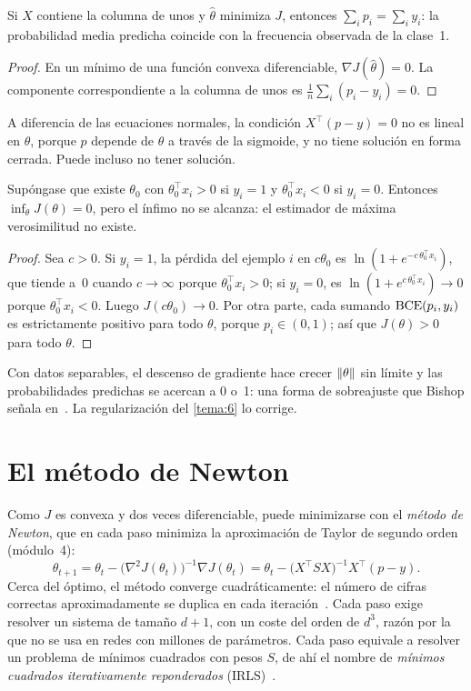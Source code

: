 \begin{corolario}\label{cor:calibracion}
Si $X$ contiene la columna de unos y $\hat\theta$ minimiza $J$, entonces $\sum_i p_i=\sum_i y_i$: la probabilidad media predicha coincide con la frecuencia observada de la clase~1.
\end{corolario}

\begin{proof}
En un mínimo de una función convexa diferenciable, $\nabla J(\hat\theta)=0$. La componente correspondiente a la columna de unos es $\frac1n\sum_i(p_i-y_i)=0$.
\end{proof}

A diferencia de las ecuaciones normales, la condición $X^{\top}(p-y)=0$ no es lineal en $\theta$, porque $p$ depende de $\theta$ a través de la sigmoide, y no tiene solución en forma cerrada. Puede incluso no tener solución.

\begin{proposicion}\label{prop:separable}
Supóngase que existe $\theta_0$ con $\theta_0^{\top}x_i>0$ si $y_i=1$ y $\theta_0^{\top}x_i<0$ si $y_i=0$. Entonces $\inf_\theta J(\theta)=0$, pero el ínfimo no se alcanza: el estimador de máxima verosimilitud no existe.
\end{proposicion}

\begin{proof}
Sea $c>0$. Si $y_i=1$, la pérdida del ejemplo $i$ en $c\theta_0$ es $\ln(1+e^{-c\,\theta_0^{\top}x_i})$, que tiende a~0 cuando $c\to\infty$ porque $\theta_0^{\top}x_i>0$; si $y_i=0$, es $\ln(1+e^{c\,\theta_0^{\top}x_i})\to 0$ porque $\theta_0^{\top}x_i<0$. Luego $J(c\theta_0)\to 0$. Por otra parte, cada sumando $\operatorname{BCE}(p_i,y_i)$ es estrictamente positivo para todo $\theta$, porque $p_i\in(0,1)$; así que $J(\theta)>0$ para todo $\theta$.
\end{proof}

Con datos separables, el descenso de gradiente hace crecer $\lVert\theta\rVert$ sin límite y las probabilidades predichas se acercan a 0 o~1: una forma de sobreajuste que Bishop señala en~\cite[§4.3.2]{bishop}. La regularización del \cref{tema:6} lo corrige.

\section{El método de Newton}

Como $J$ es convexa y dos veces diferenciable, puede minimizarse con el \emph{método de Newton}, que en cada paso minimiza la aproximación de Taylor de segundo orden (módulo~4):
\[
\theta_{t+1}=\theta_t-\bigl(\nabla^{2}J(\theta_t)\bigr)^{-1}\nabla J(\theta_t)=\theta_t-\bigl(X^{\top}SX\bigr)^{-1}X^{\top}(p-y).
\]
Cerca del óptimo, el método converge cuadráticamente: el número de cifras correctas aproximadamente se duplica en cada iteración~\cite[§2.4]{cs229}. Cada paso exige resolver un sistema de tamaño $d+1$, con un coste del orden de $d^{3}$, razón por la que no se usa en redes con millones de parámetros. Cada paso equivale a resolver un problema de mínimos cuadrados con pesos $S$, de ahí el nombre de \emph{mínimos cuadrados iterativamente reponderados} (IRLS)~\cite[§4.3.3]{bishop}.

